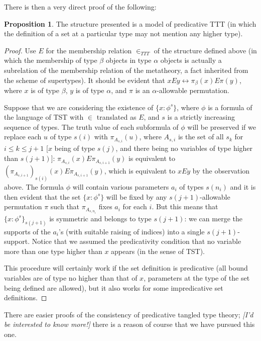 \documentclass[112pt]{article}
\theoremstyle{definition}
\newtheorem{proposition}[theorem]{Proposition}
\theoremstyle{remark}
\newcommand{\rk}[1]{{\color{blue}\sl #1}}
\newcommand{\rk}[1]{}
\begin{document}
{There is then a very direct proof of the following:}
\begin{proposition}\label{prop:predicative_ttt}
  The structure presented is a model of predicative TTT (in which the definition of a set at a particular type may not mention any higher type).
\end{proposition}
\begin{proof}

Use $E$ for the membership relation $\in_{TTT}$ of the structure defined above (in which the membership of type $\beta$ objects in type $\alpha$ objects is actually a subrelation of the membership relation of the metatheory, a fact inherited from the scheme of supertypes).  It should be evident that $x E y \leftrightarrow \pi_\beta(x) E \pi(y)$,
where $x$ is of type $\beta$, $y$ is of type $\alpha$, and $\pi$ is an $\alpha$-allowable permutation.

Suppose that we are considering the existence of $\{x : \phi^s\}$, where $\phi$ is a formula of the language of TST with $\in$ translated as $E$, and $s$ is a strictly increasing sequence of types.  The truth value of each subformula of $\phi$ will be preserved if we replace each $u$ of type $s(i)$ with $\pi_{A_{s,i}}(u)$, where  $A_{s,i}$ is the set of all $s_k$ for $i \leq k \leq j+1$ [$x$ being of type $s(j)$, and there being no variables of type higher than $s(j+1)$]:  $\pi_{A_{s,i}}(x) E  \pi_{A_{s,i+1}}(y)$ is equivalent to $(\pi_{A_{s,i+1}})_{s(i)}(x) E \pi_{A_{s,i+1}}(y)$, which is equivalent to $xEy$ by the observation above. The formula $\phi$ will contain various parameters $a_i$ of types $s(n_i)$ and it is then evident that the set $\{x : \phi^s\}$ will be fixed by any $s(j+1)$-allowable permutation $\pi$ such that $\pi_{A_{s,n_i}}$ fixes $a_i$ for each $i$.  But this means that
 $\{x : \phi^s\}_{s(j+1)}$ is symmetric and belongs to type $s(j+1)$: 
 we can merge the supports of the $a_i$'s (with suitable raising of indices) into a single $s(j+1)$-support.  Notice that we assumed the predicativity condition that no variable more than one type higher than $x$ appears (in the sense of TST).

This procedure will certainly work if the set definition is predicative (all bound variables are of type no higher than that of $x$, parameters at the type
of the set being defined are allowed), but it also works for some impredicative set definitions.
\end{proof}

There are easier proofs of the consistency of predicative tangled type theory; \rk{[I'd be interested to know more!]} 
there is a reason of course that we have pursued this one.
\end{document}
